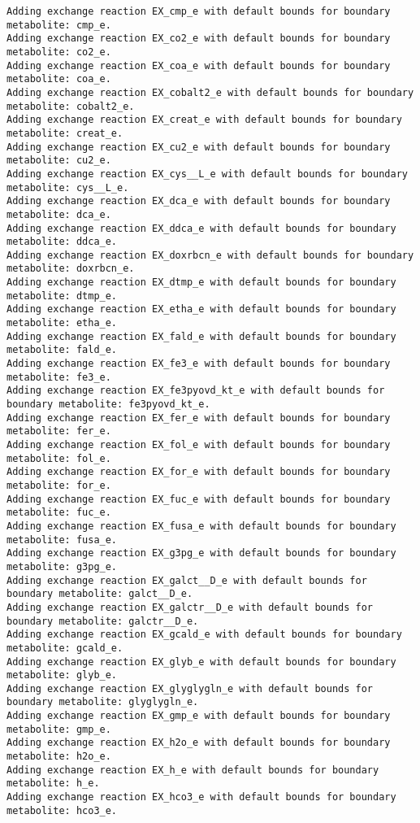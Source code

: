 \documentclass[
  letterpaper,
  DIV=11,
  numbers=noendperiod]{scrartcl}
\begin{document}
\begin{verbatim}
Adding exchange reaction EX_cmp_e with default bounds for boundary metabolite: cmp_e.
Adding exchange reaction EX_co2_e with default bounds for boundary metabolite: co2_e.
Adding exchange reaction EX_coa_e with default bounds for boundary metabolite: coa_e.
Adding exchange reaction EX_cobalt2_e with default bounds for boundary metabolite: cobalt2_e.
Adding exchange reaction EX_creat_e with default bounds for boundary metabolite: creat_e.
Adding exchange reaction EX_cu2_e with default bounds for boundary metabolite: cu2_e.
Adding exchange reaction EX_cys__L_e with default bounds for boundary metabolite: cys__L_e.
Adding exchange reaction EX_dca_e with default bounds for boundary metabolite: dca_e.
Adding exchange reaction EX_ddca_e with default bounds for boundary metabolite: ddca_e.
Adding exchange reaction EX_doxrbcn_e with default bounds for boundary metabolite: doxrbcn_e.
Adding exchange reaction EX_dtmp_e with default bounds for boundary metabolite: dtmp_e.
Adding exchange reaction EX_etha_e with default bounds for boundary metabolite: etha_e.
Adding exchange reaction EX_fald_e with default bounds for boundary metabolite: fald_e.
Adding exchange reaction EX_fe3_e with default bounds for boundary metabolite: fe3_e.
Adding exchange reaction EX_fe3pyovd_kt_e with default bounds for boundary metabolite: fe3pyovd_kt_e.
Adding exchange reaction EX_fer_e with default bounds for boundary metabolite: fer_e.
Adding exchange reaction EX_fol_e with default bounds for boundary metabolite: fol_e.
Adding exchange reaction EX_for_e with default bounds for boundary metabolite: for_e.
Adding exchange reaction EX_fuc_e with default bounds for boundary metabolite: fuc_e.
Adding exchange reaction EX_fusa_e with default bounds for boundary metabolite: fusa_e.
Adding exchange reaction EX_g3pg_e with default bounds for boundary metabolite: g3pg_e.
Adding exchange reaction EX_galct__D_e with default bounds for boundary metabolite: galct__D_e.
Adding exchange reaction EX_galctr__D_e with default bounds for boundary metabolite: galctr__D_e.
Adding exchange reaction EX_gcald_e with default bounds for boundary metabolite: gcald_e.
Adding exchange reaction EX_glyb_e with default bounds for boundary metabolite: glyb_e.
Adding exchange reaction EX_glyglygln_e with default bounds for boundary metabolite: glyglygln_e.
Adding exchange reaction EX_gmp_e with default bounds for boundary metabolite: gmp_e.
Adding exchange reaction EX_h2o_e with default bounds for boundary metabolite: h2o_e.
Adding exchange reaction EX_h_e with default bounds for boundary metabolite: h_e.
Adding exchange reaction EX_hco3_e with default bounds for boundary metabolite: hco3_e.

\end{verbatim}
\end{document}
